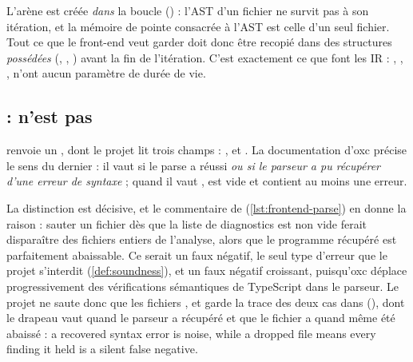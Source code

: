 
L'arène est créée \emph{dans} la boucle () : l'AST d'un fichier ne survit pas à son itération, et la mémoire de pointe consacrée à l'AST est celle d'un seul fichier. Tout ce que le front-end veut garder doit donc être recopié dans des structures \emph{possédées} (, , ) avant la fin de l'itération. C'est exactement ce que font les IR : , , ,  n'ont aucun paramètre de durée de vie.

\subsection{ :  n'est pas }

 renvoie un , dont le projet lit trois champs : ,  et . La documentation d'oxc précise le sens du dernier : il vaut  si le parse a réussi \emph{ou si le parseur a pu récupérer d'une erreur de syntaxe} ; quand il vaut ,  est vide et  contient au moins une erreur.

La distinction est décisive, et le commentaire de  (\cref{lst:frontend-parse}) en donne la raison : sauter un fichier dès que la liste de diagnostics est non vide ferait disparaître des fichiers entiers de l'analyse, alors que le programme récupéré est parfaitement abaissable. Ce serait un faux négatif, le seul type d'erreur que le projet s'interdit (\cref{def:soundness}), et un faux négatif croissant, puisqu'oxc déplace progressivement des vérifications sémantiques de TypeScript dans le parseur. Le projet ne saute donc que les fichiers , et garde la trace des deux cas dans  (), dont le drapeau  vaut  quand le parseur a récupéré et que le fichier a quand même été abaissé : \og a recovered syntax error is noise, while a dropped file means every finding it held is a silent false negative\fg{}.

